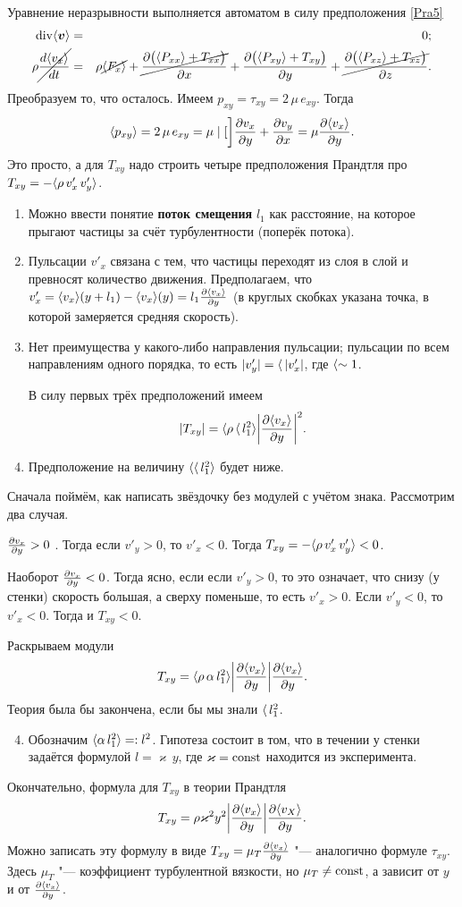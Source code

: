 Уравнение неразрывности выполняется автоматом в силу предположения \eqref{Pra5}
\begin{eqnarray*}
  \operatorname{div}\langle\boldsymbol{v}\rangle &=&0;\\
  \rho\cancel{\frac{d\langle v_x \rangle}{dt}} &=& \rho\cancel{\langle F_x \rangle} +   \cancel{\frac{\partial \big(\langle P_{xx} \rangle+T_{xx}\big)}{\partial x}} + \frac{\partial \big(\langle P_{xy} \rangle+T_{xy}\big)}{\partial y} + \cancel{\frac{\partial \big(\langle P_{xz} \rangle+T_{xz}\big)}{\partial z}}.
\end{eqnarray*}
Преобразуем то, что осталось. Имеем $p_{xy} = \tau_{xy} = 2\,\mu\,e_{xy}$. Тогда \[
  \langle p_{xy} \rangle = 2\,\mu\,e_{xy} = \mu\mid[\bigg]{\frac{\partial v_x}{\partial y}+\frac{\partial v_y}{\partial x}} = \mu\frac{\partial \langle v_x \rangle}{\partial y}.
\]
Это просто, а для $T_{xy}$ надо строить четыре предположения Прандтля про $T_{xy} = -\langle \rho\,v'_x\,v'_y \rangle$.
\begin{enumerate}
\item Можно ввести понятие \textbf{поток смещения} $l_1$ как расстояние, на которое прыгают частицы за счёт турбулентности (поперёк потока).
\item Пульсации $v'_x$ связана с тем, что частицы переходят из слоя в слой и превносят количество движения. Предполагаем, что $v'_x = \langle v_x \rangle(y+l_1) - \langle v_x \rangle(y)=l_1\frac{\partial \langle v_x \rangle}{\partial y}$ (в круглых скобках указана точка, в которой замеряется средняя скорость).
\item Нет преимущества у какого-либо направления пульсации; пульсации по всем направлениям одного порядка, то есть $|v'_y| = \langle\,|v'_x|$, где $\langle\sim1$.

В силу первых трёх предположений имеем
\[
  |T_{xy}| = \langle \rho\,\langle\,l_1^2 \rangle
\bigg|\frac{\partial \langle v_x \rangle}{\partial y}\bigg|^2.
\]
\item Предположение на величину $\langle \langle\,l_1^2 \rangle$ будет ниже.
\end{enumerate}
Сначала поймём, как написать звёздочку без модулей с учётом знака. Рассмотрим два случая.
\begin{roItems}
\item $\frac{\partial v_x}{\partial y}>0$ . Тогда если $v'_y>0$, то $v'_x<0$.
Тогда $T_{xy} = -\langle \rho\,v'_x\,v'_y \rangle<0$.
\item Наоборот $\frac{\partial v_x}{\partial y}<0$. Тогда ясно, если если $v'_y>0$, то это означает, что снизу (у стенки) скорость большая, а сверху поменьше, то есть $v'_x>0$. Если $v'_y<0$, то $v'_x<0$. Тогда и $T_{xy}<0$.
\end{roItems}
Раскрываем модули
\[
  T_{xy} = \langle \rho\,\alpha\,l_1^2 \rangle\bigg|\frac{\partial \langle v_x \rangle}{\partial y}\bigg|\frac{\partial \langle v_x \rangle}{\partial y}.
\]
Теория была бы закончена, если бы мы знали $\langle\,l_1^2$.
\begin{enumerate}\setcounter{enumi}{3}
\item Обозначим $\langle \alpha\,l_1^2 \rangle=:l^2$. Гипотеза состоит в том, что в течении у стенки задаётся формулой $l = \varkappa\,y$, где $\varkappa=\operatorname{const}$ находится из эксперимента.
\end{enumerate}
Окончательно, формула для $T_{xy}$ в теории Прандтля
\[
  T_{xy} = \rho\varkappa^2y^2\bigg|\frac{\partial \langle v_x \rangle}{\partial y}\bigg|\frac{\partial \langle v_X \rangle}{\partial y}.
\]
Можно записать эту формулу в виде $T_{xy} = \mu_T\frac{\partial \langle v_x \rangle}{\partial y}$ "--- аналогично формуле $\tau_{xy}$. Здесь $\mu_T$ "--- коэффициент турбулентной вязкости, но $\mu_T\ne\operatorname{const}$, а зависит от $y$ и от $\frac{\partial \langle v_x \rangle}{\partial y}$.

